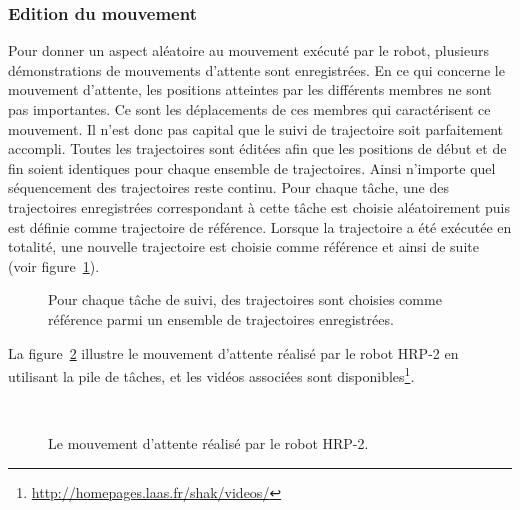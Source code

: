 
\subsubsection{Edition du mouvement}
Pour donner un aspect aléatoire au mouvement exécuté par le robot,
plusieurs démonstrations de mouvements d'attente sont enregistrées.
En ce qui concerne le mouvement d'attente, les positions atteintes
par les différents membres ne sont pas importantes. Ce sont les
déplacements de ces membres qui caractérisent ce mouvement.
Il n'est donc pas capital que le suivi de trajectoire soit parfaitement accompli.
Toutes les trajectoires sont éditées afin que les positions de début et de
fin soient identiques pour chaque ensemble de trajectoires. Ainsi n'importe quel séquencement
des trajectoires reste continu.
Pour chaque t\^ache, une des trajectoires enregistrées 
correspondant à cette t\^ache est choisie aléatoirement
puis est définie comme trajectoire de référence. Lorsque la trajectoire 
a été exécutée en totalité, une nouvelle trajectoire est choisie comme référence et ainsi de suite (voir
figure~\ref{fig:activeLoop}).
\begin{figure}[t]
  \begin{center}
    \resizebox{0.6\textwidth}{!}{
    
    }
  \end{center}
  \caption[Reproduction du mouvement d'attente.]{Pour chaque t\^ache de suivi, des trajectoires sont choisies comme
  référence parmi un ensemble de trajectoires enregistrées.}
  \label{fig:activeLoop}
\end{figure}
La figure~\ref{fig:activeWaitStrips} illustre le mouvement d'attente réalisé par le robot
HRP-2 en utilisant la pile de t\^aches, et les vidéos associées sont 
disponibles\footnote{\url{http://homepages.laas.fr/shak/videos/}}.
\begin{figure}[p]
  \begin{center}
    \\

  \end{center}
  \caption{Le mouvement d'attente réalisé par le robot HRP-2.}
  \label{fig:activeWaitStrips}
\end{figure}

